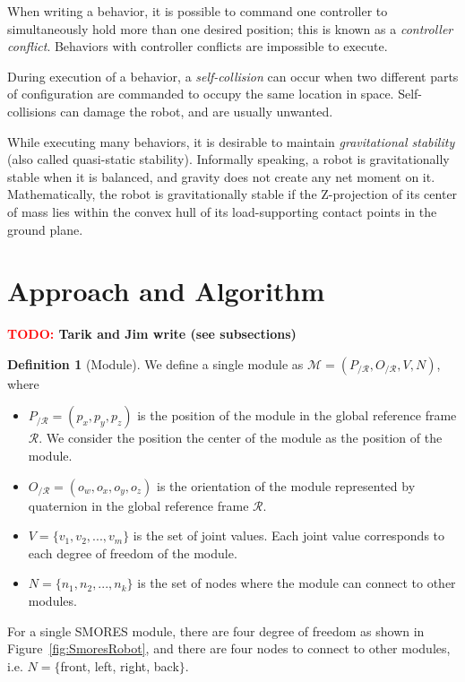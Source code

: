\documentclass[conference]{IEEEtran}
\theoremstyle{definition}
\newtheorem{definition}{Definition}[section]
\newcommand{\TODO}[1]{ {\bf \textcolor{red}{TODO:} #1 }}
\begin{document}
When writing a behavior, it is possible to command one controller to
simultaneously hold more than one desired position; this is known as a
\textit{controller conflict}.  Behaviors with controller conflicts are
impossible to execute.

During execution of a behavior, a \textit{self-collision} can occur when two
different parts of configuration are commanded to occupy the same location in
space.  Self-collisions can damage the robot, and are usually unwanted.

While executing many behaviors, it is desirable to maintain \textit{gravitational
stability} (also called quasi-static stability).  Informally speaking, a
robot is gravitationally stable when it is balanced, and gravity does not
create any net moment on it.  Mathematically, the robot is gravitationally stable
if the Z-projection of its center of
mass lies within the convex hull of its load-supporting contact points in the
ground plane.  

\section{Approach and Algorithm}
\label{sec:approach}
\TODO{Tarik and Jim write (see subsections)}
\begin{definition}[Module] 
We define a single module  as $\mathcal{M}=(P_{/\mathcal{R}}, O_{/\mathcal{R}}, V, N)$, where
\begin{itemize}
\item $P_{/\mathcal{R}}=(p_x,p_y,p_z)$ is the position of the module in the global reference frame $\mathcal{R}$. We consider the position the center of the module as the position of the module.
\item $O_{/\mathcal{R}}=(o_w, o_x, o_y, o_z)$ is the orientation of the module represented by quaternion in the global reference frame $\mathcal{R}$.
\item $V=\{v_1, v_2, ..., v_m\}$ is the set of joint values. Each joint value corresponds to each degree of freedom of the module.
\item $N=\{n_1, n_2, ..., n_k\}$ is the set of nodes where the module can connect to other modules.
\end{itemize}
For a single SMORES module, there are four degree of freedom as shown in Figure~\ref{fig:SmoresRobot}, and there are four nodes to connect to other modules, i.e. $N=\{$front, left, right, back$\}$.
\end{definition}
\end{document}
